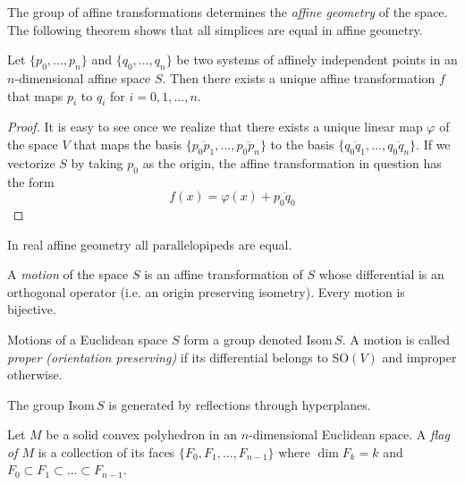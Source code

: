 \documentclass{article}
\begin{document}
    The group of affine transformations determines the \textit{affine geometry} of the space. The following theorem shows that all simplices are equal in affine geometry. 

    \begin{theorem}
      Let $\{p_0, ..., p_n\}$ and $\{q_0, ..., q_n\}$ be two systems of affinely independent points in an $n$-dimensional affine space $S$. Then there exists a unique affine transformation $f$ that maps $p_i$ to $q_i$ for $i = 0, 1, ..., n$. 
    \end{theorem}
    \begin{proof}
      It is easy to see once we realize that there exists a unique linear map $\varphi$ of the space $V$ that maps the basis $\{\overline{p_0 p_1}, ..., \overline{p_0 p_n}\}$ to the basis $\{\overline{q_0 q_1}, ..., \overline{q_0 q_n}\}$. If we vectorize $S$ by taking $p_0$ as the origin, the affine transformation in question has the form 
      \begin{equation}
        f(x) = \varphi(x) + \overline{p_0 q_0}
      \end{equation}
    \end{proof}

    \begin{corollary}
      In real affine geometry all parallelopipeds are equal. 
    \end{corollary}

    \begin{definition}
      A \textit{motion} of the space $S$ is an affine transformation of $S$ whose differential is an orthogonal operator (i.e. an origin preserving isometry). Every motion is bijective. 
    \end{definition}

    Motions of a Euclidean space $S$ form a group denoted Isom$\,S$. A motion is called \textit{proper (orientation preserving)} if its differential belongs to SO$(V)$ and improper otherwise. 

    \begin{lemma}
      The group Isom$\,S$ is generated by reflections through hyperplanes. 
    \end{lemma}

    \begin{definition}
      Let $M$ be a solid convex polyhedron in an $n$-dimensional Euclidean space. A \textit{flag of $M$} is a collection of its faces $\{F_0, F_1, ..., F_{n-1}\}$ where $\dim{F_k} = k$ and $F_0 \subset F_1 \subset ... \subset F_{n-1}$. 
    \end{definition}
\end{document}
